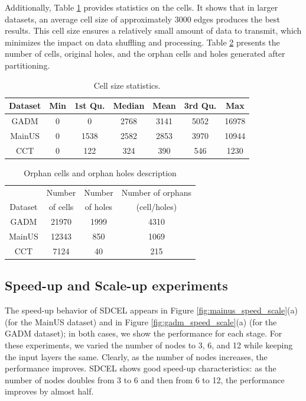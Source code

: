 Additionally, Table \ref{tab:cell_stats} provides statistics on the cells. It shows that in larger datasets, an average cell size of approximately 3000 edges produces the best results. This cell size ensures a relatively small amount of data to transmit, which minimizes the impact on data shuffling and processing.  Table \ref{tab:orphans} presents the number of cells, original holes, and the orphan cells and holes generated after partitioning.

\begin{table}
    \centering
    \caption{Cell size statistics.}
    \label{tab:cell_stats}
    \begin{tabular}{ccccccc}
        \toprule
        Dataset & Min & 1st Qu. & Median & Mean & 3rd Qu. & Max   \\
        \midrule
        GADM    & 0   & 0       & 2768   & 3141 & 5052    & 16978 \\
        MainUS  & 0   & 1538    & 2582   & 2853 & 3970    & 10944 \\
        CCT     & 0   & 122     & 324    & 390  & 546     & 1230  \\
        \bottomrule
    \end{tabular}
\end{table}

\begin{table}
    \centering
    \caption{Orphan cells and orphan holes description}
    \label{tab:orphans}
    \begin{tabular}{c c c c}
        \toprule
                & Number   & Number   & Number of orphans   \\
        Dataset & of cells & of holes & (cell/holes) \\
        \midrule
        GADM  & 21970      & 1999     & 4310 \\
        MainUS& 12343      & 850      & 1069 \\
        CCT   & 7124       & 40       & 215  \\
        \bottomrule
    \end{tabular}
\end{table}

\subsection{Speed-up and Scale-up experiments} \label{sec:speed_scale}
The speed-up behavior of SDCEL appears in Figure \ref{fig:mainus_speed_scale}(a) (for the MainUS dataset) and in Figure \ref{fig:gadm_speed_scale}(a) (for the GADM dataset); in both cases, we show the performance for each stage. For these experiments, we varied the number of nodes to 3, 6, and 12 while keeping the input layers the same. Clearly, as the number of nodes increases, the performance improves. SDCEL shows good speed-up characteristics: as the number of nodes doubles from 3 to 6 and then from 6 to 12, the performance improves by almost half.

